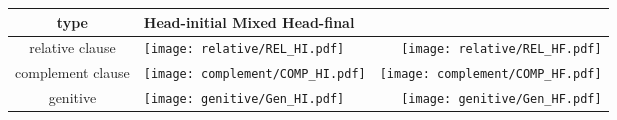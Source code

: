 \documentclass{article}
\begin{document}
\begin{table}[ht] 
   \begin{tabular}{  c | l  r } \hline 
        type & \multicolumn{2}{l}{\hspace{0.5cm} Head-initial\hspace{2cm} Mixed\hspace{2.5cm} Head-final} \\
   \hline
 relative clause & \parbox[c]{14em}{\texttt{[image: relative/REL\_HI.pdf]}} &\parbox[c]{14em}{\texttt{[image: relative/REL\_HF.pdf]}} \\
 complement clause & \parbox[c]{14em}{\texttt{[image: complement/COMP\_HI.pdf]}} &\parbox[c]{14em}{\texttt{[image: complement/COMP\_HF.pdf]}} \\
genitive & \parbox[c]{14em}{\texttt{[image: genitive/Gen\_HI.pdf]}} &\parbox[c]{14em}{\texttt{[image: genitive/Gen\_HF.pdf]}} \\
    \hline
  \end{tabular}
\end{table}
\end{document}
